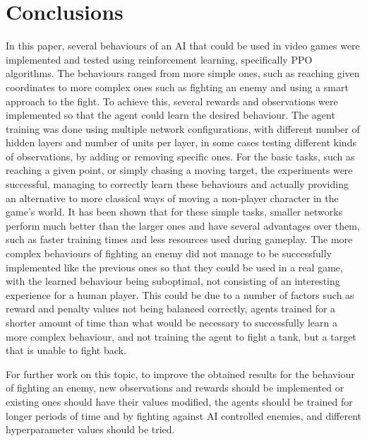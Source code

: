 \chapter{Conclusions}



In this paper, several behaviours of an AI that could be used in video games were implemented and tested using reinforcement learning, specifically PPO algorithms. The behaviours ranged from more simple ones, such as reaching given coordinates to more complex ones such as fighting an enemy and using a smart approach to the fight. To achieve this, several rewards and observations were implemented so that the agent could learn the desired behaviour. The agent training was done using multiple network configurations, with different number of hidden layers and number of units per layer, in some cases testing different kinds of observations, by adding or removing specific ones. For the basic tasks, such as reaching a given point, or simply chasing a moving target, the experiments were successful, managing to correctly learn these behaviours and actually providing an alternative to more classical ways of moving a non-player character in the game's world. It has been shown that for these simple tasks, smaller networks perform much better than the larger ones and have several advantages over them, such as faster training times and less resources used during gameplay. The more complex behaviours of fighting an enemy did not manage to be successfully implemented like the previous ones so that they could be used in a real game, with the learned behaviour being suboptimal, not consisting of an interesting experience for a human player. This could be due to a number of factors such as reward and penalty values not being balanced correctly, agents trained for a shorter amount of time than what would be necessary to successfully learn a more complex behaviour, and not training the agent to fight a tank, but a target that is unable to fight back.

For further work on this topic, to improve the obtained results for the behaviour of fighting an enemy, new observations and rewards should be implemented or existing ones should have their values modified, the agents should be trained for longer periods of time and by fighting against AI controlled enemies, and different hyperparameter values should be tried.